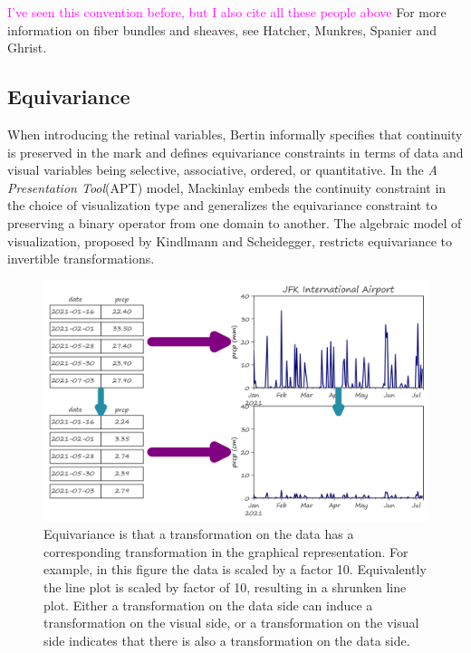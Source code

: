 \documentclass[10pt,journal,compsoc]{IEEEtran}
\newcommand{\note}[1]{\textcolor{magenta}{#1}}
\theoremstyle{definition}
\theoremstyle{remark}
\begin{document}
\note{I've seen this convention before, but I also cite all these people above}
For more information on fiber bundles and sheaves, see Hatcher\cite{hatcherAlgebraicTopology2002}, Munkres\cite{munkresElementsAlgebraicTopology1984}, Spanier \cite{spanier1989algebraic} and Ghrist\cite{ghristElementaryAppliedTopology2014,ghristHomologicalAlgebraData2018}. 

\subsection{Equivariance}
\label{sec:related-work:equivariance}
When introducing the retinal variables, Bertin informally specifies that continuity is preserved in the mark and defines equivariance constraints in terms of data and visual variables being selective, associative, ordered, or quantitative\cite{bertinSemiologyGraphicsDiagrams2011a}. In the \textit{A Presentation Tool}(APT) model, Mackinlay embeds the continuity constraint in the choice of visualization type and generalizes the equivariance constraint to preserving a binary operator from one domain to another. The algebraic model of visualization\cite{kindlmannAlgebraicProcessVisualization2014}, proposed by Kindlmann and Scheidegger, restricts equivariance to invertible transformations.

\begin{figure}[!h]
  \label{fig:related-work:equivariance}
  \includegraphics[width=\columnwidth]{equiv.png}
  \caption{Equivariance is that a transformation on the data has a corresponding transformation in the graphical representation. For example, in this figure the data is scaled by a factor 10. Equivalently the line plot is scaled by factor of 10, resulting in a shrunken line plot. Either a transformation on the data side can induce a transformation on the visual side, or a transformation on the visual side indicates that there is also a transformation on the data side. }
\end{figure}
\end{document}
